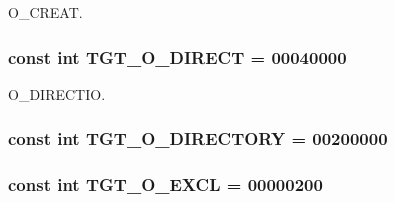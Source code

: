 O\_\-CREAT. \hypertarget{classX86Linux32_ae5d685a6a2ee8c6fe0ede370f0bec588}{
\subsubsection[{TGT\_\-O\_\-DIRECT}]{\setlength{\rightskip}{0pt plus 5cm}const int {\bf TGT\_\-O\_\-DIRECT} = 00040000}}
\label{classX86Linux32_ae5d685a6a2ee8c6fe0ede370f0bec588}


O\_\-DIRECTIO. \hypertarget{classX86Linux32_a1f10d158ad65ad6389078ba44629788a}{
\subsubsection[{TGT\_\-O\_\-DIRECTORY}]{\setlength{\rightskip}{0pt plus 5cm}const int {\bf TGT\_\-O\_\-DIRECTORY} = 00200000}}
\label{classX86Linux32_a1f10d158ad65ad6389078ba44629788a}
\hypertarget{classX86Linux32_a10d5d118d15b51ebdd4b16dc78342d1d}{
\subsubsection[{TGT\_\-O\_\-EXCL}]{\setlength{\rightskip}{0pt plus 5cm}const int {\bf TGT\_\-O\_\-EXCL} = 00000200}}
\label{classX86Linux32_a10d5d118d15b51ebdd4b16dc78342d1d}



